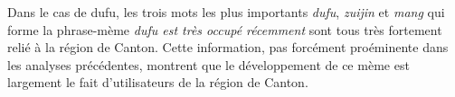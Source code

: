 Dans le cas de dufu, les trois mots les plus importants
\textit{dufu}, \textit{zuijin} et \textit{mang} qui forme la
phrase-m\`eme \textit{dufu est tr\`es occup\'e
r\'ecemment }sont tous tr\`es fortement reli\'e \`a
la r\'egion de Canton. Cette information, pas forc\'ement pro\'eminente
dans les analyses pr\'ec\'edentes, montrent que le d\'eveloppement de
ce m\`eme est largement le fait d{\textquoteright}utilisateurs de la
r\'egion de Canton.